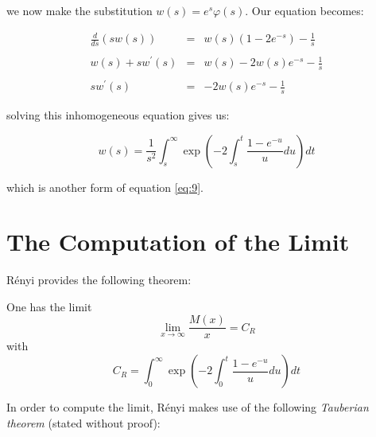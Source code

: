 we now make the substitution $w(s) = e^{s} \varphi(s)$. Our equation becomes: \bigskip

\begin{eqnarray*}
	\frac{d}{ds} \left( s w(s) \right) & = & w(s) ( 1 - 2 e^{-s}) - \frac{1}{s} \\\\
				w(s) + s w^{\prime}(s) & = & w(s) - 2 w(s) e^{-s} - \frac{1}{s} \\\\
					   s w^{\prime}(s) & = & - 2 w(s) e^{-s} - \frac{1}{s} 
\end{eqnarray*}\medskip

%

solving this inhomogeneous equation gives us: \bigskip

\[
	w(s) = \frac{1}{s^2} \int_{s}^{\infty} \exp \left( -2 \int_{s}^{t} \frac{1 - e^{-u}}{u} du \right) dt
\]\medskip

which is another form of equation \ref{eq:9}.










\section{The Computation of the Limit}

R\'enyi provides the following theorem: \bigskip 

\begin{theorem}
	One has the limit
	\[
		\lim_{x \to \infty} \frac{M(x)}{x} = C_R
	\]
	with
	\[
		C_R = \int_{0}^{\infty} \exp \left( -2 \int_{0}^{t} \frac{1 - e^{-u}}{u} du \right) dt
	\]
\end{theorem}\bigskip

In order to compute the limit, R\'enyi makes use of the following 
\emph{Tauberian theorem} (stated without proof):\bigskip


